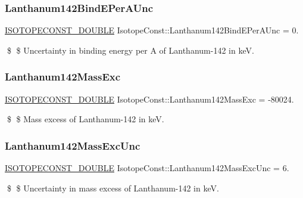 \subsubsection{\texorpdfstring{Lanthanum142\+Bind\+E\+Per\+A\+Unc}{Lanthanum142BindEPerAUnc}}
{\footnotesize\ttfamily \mbox{\hyperlink{group___isotope_const-_macros_ga8f45a7272ce02c0b4c65c44636ed719a}{I\+S\+O\+T\+O\+P\+E\+C\+O\+N\+S\+T\+\_\+\+D\+O\+U\+B\+LE}} Isotope\+Const\+::\+Lanthanum142\+Bind\+E\+Per\+A\+Unc = 0.}

\$ \$ Uncertainty in binding energy per A of Lanthanum-\/142 in keV. \mbox{\label{group___isotope_const-_lanthanum-_la142_ga53d708dcd13c54679fbc447117a42d8f}} 
\subsubsection{\texorpdfstring{Lanthanum142\+Mass\+Exc}{Lanthanum142MassExc}}
{\footnotesize\ttfamily \mbox{\hyperlink{group___isotope_const-_macros_ga8f45a7272ce02c0b4c65c44636ed719a}{I\+S\+O\+T\+O\+P\+E\+C\+O\+N\+S\+T\+\_\+\+D\+O\+U\+B\+LE}} Isotope\+Const\+::\+Lanthanum142\+Mass\+Exc = -\/80024.}

\$ \$ Mass excess of Lanthanum-\/142 in keV. \mbox{\label{group___isotope_const-_lanthanum-_la142_ga38e7972897882f3784d8d0616a98225a}} 
\subsubsection{\texorpdfstring{Lanthanum142\+Mass\+Exc\+Unc}{Lanthanum142MassExcUnc}}
{\footnotesize\ttfamily \mbox{\hyperlink{group___isotope_const-_macros_ga8f45a7272ce02c0b4c65c44636ed719a}{I\+S\+O\+T\+O\+P\+E\+C\+O\+N\+S\+T\+\_\+\+D\+O\+U\+B\+LE}} Isotope\+Const\+::\+Lanthanum142\+Mass\+Exc\+Unc = 6.}

\$ \$ Uncertainty in mass excess of Lanthanum-\/142 in keV. \mbox{\label{group___isotope_const-_lanthanum-_la142_gab1a7327cc5b1cae7738136ee4ee6a822}} 
